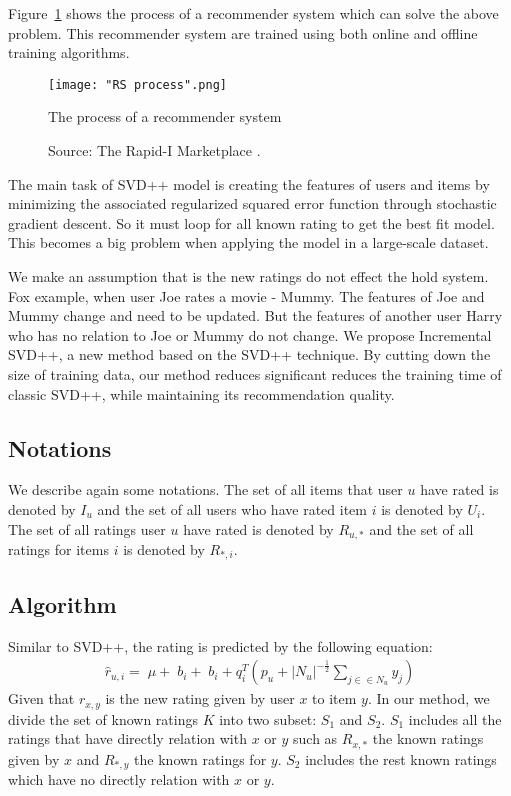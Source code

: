 \documentclass[oneside,13pt]{extreport}
\begin{document}
Figure~\ref{fig:RS_process} shows the process of a recommender system which can solve the above problem. This recommender system are trained using both online and offline training algorithms.
\clearpage
\begin{figure}[h!]
    \centering
    \texttt{[image: "RS process".png]} 
    \caption{The process of a recommender system}
    \!\!\!\!
    \caption*{Source: The Rapid-I Marketplace .}
    \label{fig:RS_process}
\end{figure}


The main task of SVD++ model is creating the features of users and items by minimizing the associated regularized squared error function through stochastic gradient descent. So it must loop for all known rating to get the best fit model. This becomes a big problem when applying the model in a large-scale dataset.
 
We make an assumption that is the new ratings do not effect the hold system. Fox example, when user Joe rates  a movie - Mummy. The features of Joe and Mummy change and need to be updated. But the features of another user Harry who has no relation to Joe or Mummy do not change. We propose Incremental SVD++, a new method based on the SVD++ technique. By cutting down the size of training data, our method reduces significant reduces the training time of classic SVD++, while maintaining its recommendation quality. 

\subsection{Notations}
We describe again some notations.
The set of all items that user $u$ have rated is denoted by $I_u$ and the set of all users who have rated item $i$ is denoted by $U_i$.
The set of all ratings user $u$ have rated is denoted by $R_{u,*}$ and the set of all ratings for items $i$ is denoted by $R_{*,i}$.
\subsection{Algorithm}
Similar to SVD++, the rating is predicted by the following equation:
\begin{eqnarray}
\label{eq:isvd++_pre1}
{\hat r_{u,i}} = \;\mu  + \;{b_i} + \;{b_i} + q_i^T\left( {{p_u} + {{\left| {{N_u}} \right|}^{ - \frac{1}{2}}}\sum\limits_{j \in  \in {N_u}} {{y_j}} } \right)
\end{eqnarray}
Given that $r_{x,y}$ is the new rating given by user $x$ to item $y$.
In our method, we divide the set of known ratings $K$ into two subset: $S_1$ and $S_2$. $S_1$ includes all the ratings that have directly relation with $x$ or $y$ such as $R_{x,*}$ the known ratings given by $x$  and $R_{*,y}$ the known ratings for $y$. $S_2$ includes the rest known ratings which have no directly relation with $x$ or $y$.
\end{document}
